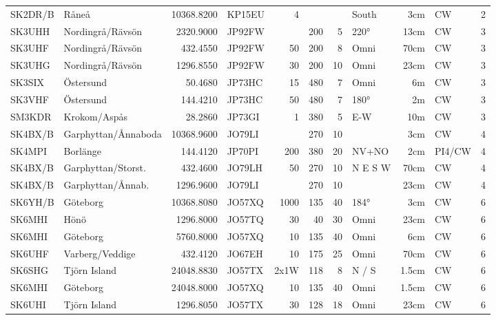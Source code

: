 \begin{longtable}{llrlrrrlrll}
	SK2DR/B  & Råneå               & 10368.8200 & KP15EU &    4 &      &      & South   &   3cm & CW     & 2    \\
	SK3UHH   & Nordingrå/Rävsön    &  2320.9000 & JP92FW &      &  200 &    5 & 220°    &  13cm & CW     & 3    \\
	SK3UHF   & Nordingrå/Rävsön    &   432.4550 & JP92FW &   50 &  200 &    8 & Omni    &  70cm & CW     & 3    \\
	SK3UHG   & Nordingrå/Rävsön    &  1296.8550 & JP92FW &   30 &  200 &   10 & Omni    &  23cm & CW     & 3    \\
	SK3SIX   & Östersund           &    50.4680 & JP73HC &   15 &  480 &    7 & Omni    &    6m & CW     & 3    \\
	SK3VHF   & Östersund           &   144.4210 & JP73HC &   50 &  480 &    7 & 180°    &    2m & CW     & 3    \\
	SM3KDR   & Krokom/Aspås        &    28.2860 & JP73GI &    1 &  380 &    5 & E-W     &   10m & CW     & 3    \\
	SK4BX/B  & Garphyttan/Ånnaboda & 10368.9600 & JO79LI &      &  270 &   10 &         &   3cm & CW     & 4    \\
	SK4MPI   & Borlänge            &   144.4120 & JP70PI &  200 &  380 &   20 & NV+NO   &   2cm & PI4/CW & 4    \\
	SK4BX/B  & Garphyttan/Storst.  &   432.4600 & JO79LH &   50 &  270 &   10 & N E S W &  70cm & CW     & 4    \\
	SK4BX/B  & Garphyttan/Ånnab.   &  1296.9600 & JO79LI &      &  270 &   10 &         &  23cm & CW     & 4    \\
	SK6YH/B  & Göteborg            & 10368.8080 & JO57XQ & 1000 &  135 &   40 & 184°    &   3cm & CW     & 6    \\
	SK6MHI   & Hönö                &  1296.8000 & JO57TQ &   30 &   40 &   30 & Omni    &  23cm & CW     & 6    \\
	SK6MHI   & Göteborg            &  5760.8000 & JO57XQ &   10 &  135 &   40 & Omni    &   6cm & CW     & 6    \\
	SK6UHF   & Varberg/Veddige     &   432.4120 & JO67EH &   10 &  175 &   25 & Omni    &  70cm & CW     & 6    \\
	SK6SHG   & Tjörn Island        & 24048.8830 & JO57TX & 2x1W &  118 &    8 & N / S   & 1.5cm & CW     & 6    \\
	SK6MHI   & Göteborg            & 24048.8000 & JO57XQ &   10 &  135 &   40 & Omni    & 1.5cm & CW     & 6    \\
	SK6UHI   & Tjörn Island        &  1296.8050 & JO57TX &   30 &  128 &   18 & Omni    &  23cm & CW     & 6    \\

\end{longtable}
